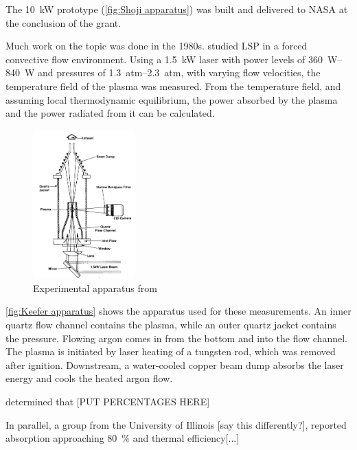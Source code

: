         The \qty{10}{kW} prototype (\autoref{fig:Shoji apparatus}) was built and delivered to NASA at the conclusion of the grant.

        Much work on the topic was done in the 1980s. \textcite{keeferPowerAbsorptionLasersustained1986a} studied LSP in a forced convective flow environment. Using a \qty{1.5}{kW}  laser with power levels of \qtyrange{360}{840}{W} and pressures of \qtyrange{1.3}{2.3}{atm}, with varying flow velocities, the temperature field of the plasma was measured. From the temperature field, and assuming local thermodynamic equilibrium, the power absorbed by the plasma and the power radiated from it can be calculated.
        \begin{figure}[h!]
            \centering
            \includegraphics[width=0.35\textwidth]{assets/2 background/UTSI (Keefer) Apparatus.png}
            \caption{Experimental apparatus from \textcite{keeferPowerAbsorptionLasersustained1986a}}
            \label{fig:Keefer apparatus}
        \end{figure}
        \autoref{fig:Keefer apparatus} shows the apparatus used for these measurements. An inner quartz flow channel contains the plasma, while an outer quartz jacket contains the pressure. Flowing argon comes in from the bottom and into the flow channel. The plasma is initiated by laser heating of a tungsten rod, which was removed after ignition. Downstream, a water-cooled copper beam dump absorbs the laser energy and cools the heated argon flow.

         determined that [PUT PERCENTAGES HERE]

        In parallel, a group from the University of Illinois [say this differently?], reported absorption approaching \qty{80}{\%} and thermal efficiency[...]

